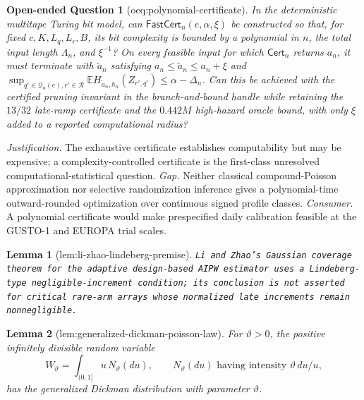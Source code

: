 \documentclass{article}
\newtheorem{lemma}{Lemma}
\newtheorem{openendedquestion}{Open-ended Question}
\begin{document}
\begin{openendedquestion}[oeq:polynomial-certificate]\label{oeq:polynomial-certificate}
In the deterministic multitape Turing bit model, can \(\mathsf{FastCert}_n(e,\alpha,\xi)\) be constructed so that, for fixed \(c,K,L_q,L_r,B\), its bit complexity is bounded by a polynomial in \(n\), the total input length \(\Lambda_n\), and \(\xi^{-1}\)? On every feasible input for which \(\mathsf{Cert}_n\) returns \(a_n\), it must terminate with \(\widetilde a_n\) satisfying \(a_n\le\widetilde a_n\le a_n+\xi\) and \(\sup_{q'\in\mathcal Q_n(e),r'\in\mathcal R}\mathbb E H_{\widetilde a_n,h_n}(Z_{r',q'})\le\alpha-\Delta_n\). Can this be achieved with the certified pruning invariant in the branch-and-bound handle while retaining the \(13/32\) late-ramp certificate and the \(0.442M\) high-hazard oracle bound, with only \(\xi\) added to a reported computational radius?
\end{openendedquestion}
\par\smallskip\noindent \textit{Justification.} The exhaustive certificate establishes computability but may be expensive; a complexity-controlled certificate is the first-class unresolved computational-statistical question. \textit{Gap.} Neither classical compound-Poisson approximation nor selective randomization inference gives a polynomial-time outward-rounded optimization over continuous signed profile classes. \textit{Consumer.} A polynomial certificate would make prespecified daily calibration feasible at the GUSTO-1 and EUROPA trial scales.

\begin{lemma}[lem:li-zhao-lindeberg-premise]\label{lem:li-zhao-lindeberg-premise}
\texttt{Li and Zhao's Gaussian coverage theorem for the adaptive design-\allowbreak{}based AIPW estimator uses a Lindeberg-\allowbreak{}type negligible-\allowbreak{}increment condition;\allowbreak{} its conclusion is not asserted for critical rare-\allowbreak{}arm arrays whose normalized late increments remain nonnegligible.}
\end{lemma}

\begin{lemma}[lem:generalized-dickman-poisson-law]\label{lem:generalized-dickman-poisson-law}
For \(\vartheta>0\), the positive infinitely divisible random variable
\[
 W_\vartheta=\int_{(0,1]}u\,N_\vartheta(du),
 \qquad N_\vartheta(du)\text{ having intensity }\vartheta\,du/u,
\]
has the generalized Dickman distribution with parameter \(\vartheta\).
\end{lemma}
\end{document}
